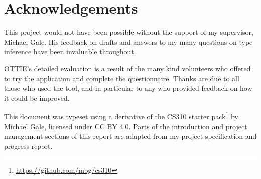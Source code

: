 \documentclass[a4paper,fleqn,oneside,12pt]{report}
\begin{document}
\chapter*{Acknowledgements}\label{id:h.xqaef57orpsv}

This project would not have been possible without the support of my supervisor, Michael Gale. His feedback on drafts and answers to my many questions on type inference have been invaluable throughout.

OTTIE's detailed evaluation is a result of the many kind volunteers who offered to try the application and complete the questionnaire. Thanks are due to all those who used the tool, and in particular to any who provided feedback on how it could be improved.

This document was typeset using a derivative of the CS310 starter pack\footnote{\href{https://github.com/mbg/cs310}{https://github.com/mbg/cs310}} by Michael Gale, licensed under CC BY 4.0. Parts of the introduction and project management sections of this report are adapted from my project specification and progress report.

\newpage
{}
{}


\end{document}
